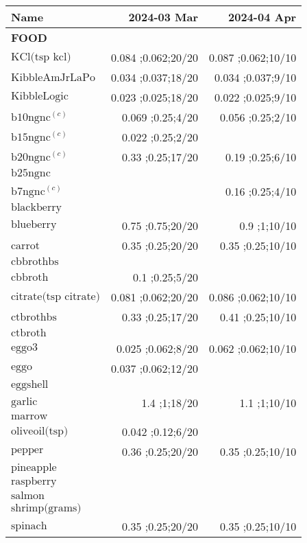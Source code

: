 \begin{table}[H]
\centering
\begin{tabular}{|l|r|r|}
\hline
Name&2024-03 Mar&2024-04 Apr\\
\hline
{\bf FOOD}&&\\
$\textrm{KCl(tsp~kcl)}$&0.084 ;0.062;20/20&0.087 ;0.062;10/10\\
$\textrm{KibbleAmJrLaPo}$&0.034 ;0.037;18/20&0.034 ;0.037;9/10\\
$\textrm{KibbleLogic}$&0.023 ;0.025;18/20&0.022 ;0.025;9/10\\
$\textrm{b10ngnc}^{\left(c\right)}$&0.069 ;0.25;4/20&0.056 ;0.25;2/10\\
$\textrm{b15ngnc}^{\left(c\right)}$&0.022 ;0.25;2/20&\\
$\textrm{b20ngnc}^{\left(c\right)}$&0.33 ;0.25;17/20&0.19 ;0.25;6/10\\
$\textrm{b25ngnc}$&&\\
$\textrm{b7ngnc}^{\left(c\right)}$&&0.16 ;0.25;4/10\\
$\textrm{blackberry}$&&\\
$\textrm{blueberry}$&0.75 ;0.75;20/20&0.9 ;1;10/10\\
$\textrm{carrot}$&0.35 ;0.25;20/20&0.35 ;0.25;10/10\\
$\textrm{cbbrothbs}$&&\\
$\textrm{cbbroth}$&0.1 ;0.25;5/20&\\
$\textrm{citrate(tsp~citrate)}$&0.081 ;0.062;20/20&0.086 ;0.062;10/10\\
$\textrm{ctbrothbs}$&0.33 ;0.25;17/20&0.41 ;0.25;10/10\\
$\textrm{ctbroth}$&&\\
$\textrm{eggo3}$&0.025 ;0.062;8/20&0.062 ;0.062;10/10\\
$\textrm{eggo}$&0.037 ;0.062;12/20&\\
$\textrm{eggshell}$&&\\
$\textrm{garlic}$&1.4 ;1;18/20&1.1 ;1;10/10\\
$\textrm{marrow}$&&\\
$\textrm{oliveoil(tsp)}$&0.042 ;0.12;6/20&\\
$\textrm{pepper}$&0.36 ;0.25;20/20&0.35 ;0.25;10/10\\
$\textrm{pineapple}$&&\\
$\textrm{raspberry}$&&\\
$\textrm{salmon}$&&\\
$\textrm{shrimp(grams)}$&&\\
$\textrm{spinach}$&0.35 ;0.25;20/20&0.35 ;0.25;10/10\\

\end{tabular}
\end{table}
